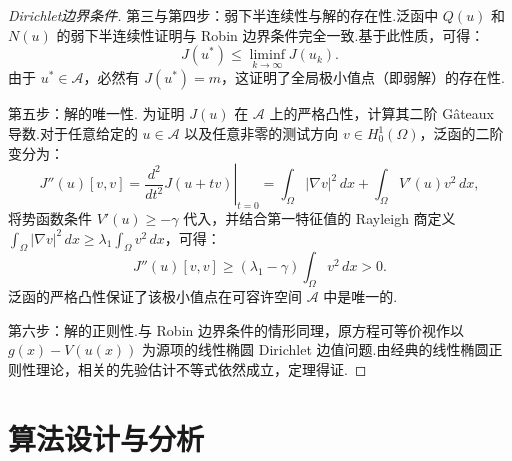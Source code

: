 \begin{proof}[Dirichlet边界条件]
第三与第四步：弱下半连续性与解的存在性.泛函中 $Q(u)$ 和 $N(u)$ 的弱下半连续性证明与 Robin 边界条件完全一致.基于此性质，可得：
$$J(u^*) \le \liminf_{k \to \infty} J(u_k).$$
由于 $u^* \in \mathcal{A}$，必然有 $J(u^*) = m$，这证明了全局极小值点（即弱解）的存在性.

第五步：解的唯一性.
为证明 $J(u)$ 在 $\mathcal{A}$ 上的严格凸性，计算其二阶 Gâteaux 导数.对于任意给定的 $u \in \mathcal{A}$ 以及任意非零的测试方向 $v \in H^1_0(\Omega)$，泛函的二阶变分为：
$$J''(u)[v, v] = \left. \frac{d^2}{dt^2} J(u + tv) \right|_{t=0} = \int_{\Omega} |\nabla v|^2 \, dx + \int_{\Omega} V'(u)v^2 \, dx,$$
将势函数条件 $V'(u) \ge -\gamma$ 代入，并结合第一特征值的 Rayleigh 商定义 $\int_{\Omega} |\nabla v|^2 \, dx \ge \lambda_1 \int_{\Omega} v^2 \, dx$，可得：
$$J''(u)[v, v] \ge (\lambda_1 - \gamma) \int_{\Omega} v^2 \, dx > 0.$$
泛函的严格凸性保证了该极小值点在可容许空间 $\mathcal{A}$ 中是唯一的.

第六步：解的正则性.与 Robin 边界条件的情形同理，原方程可等价视作以 $g(x) - V(u(x))$ 为源项的线性椭圆 Dirichlet 边值问题.由经典的线性椭圆正则性理论，相关的先验估计不等式依然成立，定理得证.
\end{proof}



\section{算法设计与分析}\label{sec:mod}
